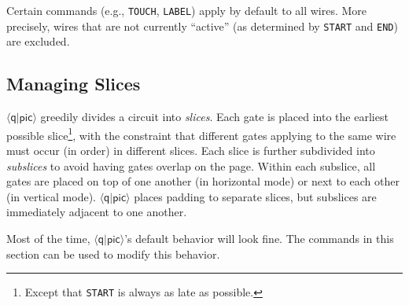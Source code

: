 \documentclass[twoside,12pt]{article}
\newcommand{\qpic}{$\langle\mathsf{q}|\mathsf{pic}\rangle$\xspace}
\begin{document}
\begin{description}
\begin{minipage}[b]{2in}

\end{minipage} \hfill 

Certain commands (e.g., {\tt TOUCH}, {\tt LABEL}) apply by default to all wires.  More
precisely, wires that are not currently ``active'' (as determined by {\tt START} and
{\tt END}) are excluded.

\end{description}

\subsection{Managing Slices}
\label{sec-qpic-touch}
\label{sec-qpic-depth}

\qpic greedily divides a circuit into \emph{slices}.  Each gate is placed into the earliest possible slice\footnote{Except that {\tt START} is always as late as possible.}, with
the constraint that different gates applying to the same wire must occur (in order) in different slices.
Each slice is further subdivided into \emph{subslices} to avoid having gates overlap on the page.  Within each
subslice, all gates are placed on top of one another (in horizontal mode) or next to each other (in vertical mode).
\qpic places padding to separate slices, but subslices are immediately adjacent to one another.


Most of the time, \qpic's default behavior will look fine.  The commands in this section can be used to modify this behavior.
\end{document}
